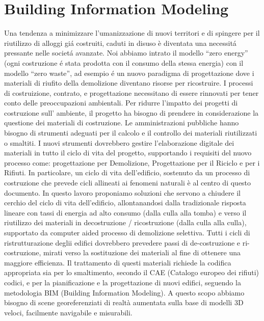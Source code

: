 \section{Building Information Modeling}
\label{sec:chapter_1_section_1}
\noindent


Una tendenza a minimizzare l'umanizzazione di nuovi territori e di spingere per il riutilizzo di alloggi
gi\'a costruiti, caduti in disuso \`e diventata una necessit\'a pressante nelle societ\'a avanzate.
Noi abbiamo intrato il modello ``zero energy'' (ogni costruzione \'e stata prodotta con il consumo della stessa energia)
con il modello ``zero waste'', ad esempio \'e un nuovo paradigma di progettazione dove i materiali di riufito della demolizione
diventano risorse per ricostruire\cite{altamura:12}.
I processi di costruizione, contrato, e progettazione necessitano di essere rinnovati per tener conto delle preoccupazioni
ambientali. Per ridurre l'impatto dei progetti di costruzione sull' ambiente, il progetto ha bisogno di prendere in
considerazione la questione dei materiali di costruzione.
Le amministrazioni pubbliche hanno bisogno di strumenti adeguati per il calcolo e il controllo dei materiali riutilizzati o smaltiti.
I nuovi strumenti dovrebbero gestire l'elaborazione digitale dei materiali in tutto il ciclo di vita del progetto,
supportando i requisiti del nuovo processo come: progettazione per Demolizione, Progettazione per il Riciclo e per i Rifiuti.
In particolare, un ciclo di vita dell'edificio, sostenuto da un processo di costruzione che prevede cicli allineati
ai fenomeni naturali è al centro di questo documento.
In questo lavoro proponiamo soluzioni che servono a chiudere il cerchio del ciclo di vita dell'edificio, allontanandosi
dalla tradizionale risposta lineare con tassi di energia ad alto consumo (dalla culla alla tomba) e verso il riutilizzo
dei materiali in decostruzione / ricostruzione (dalla culla alla culla),
supportato da computer aided processo di demolizione selettiva.
Tutti i cicli di ristrutturazione deglii edifici dovrebbero prevedere passi di de-costruzione e ri-costruzione, mirati
verso la sostituzione dei materiali al fine di ottenere una maggiore efficienza. Il trattamento di questi materiali
richiede la codifica appropriata sia per lo smaltimento, secondo il CAE (Catalogo europeo dei rifiuti) codici,
e per la pianificazione e la progettazione di nuovi edifici, seguendo la metodologia BIM (Building Information Modeling).
A questo scopo abbiamo bisogno di scene georeferenziati di realtà aumentata sulla base di modelli 3D veloci,
facilmente navigabile e misurabili.
